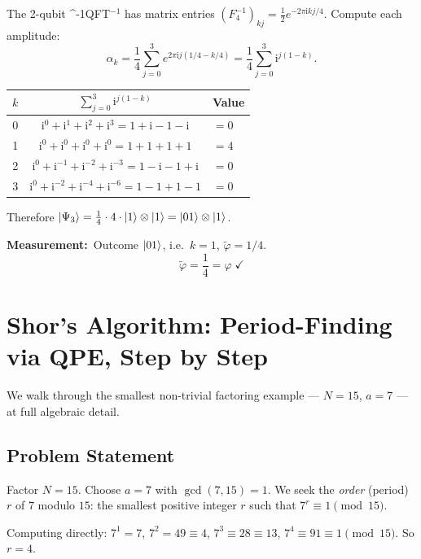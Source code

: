 \documentclass[12pt,a4paper]{article}
\newcommand{\IQFT}{\ifmmode \text{\textsc{QFT}}^{-1}\else \textsc{QFT}$^{-1}$\fi}
\newcommand{\ii}{\mathrm{i}}
\begin{document}
The 2-qubit \IQFT{} has matrix entries
$(F_4^{-1})_{kj} = \frac{1}{2}e^{-2\pi\ii kj/4}$.  Compute each amplitude:
\[
  \alpha_k = \frac{1}{4}\sum_{j=0}^3 e^{2\pi\ii j(1/4 - k/4)}
           = \frac{1}{4}\sum_{j=0}^3 \ii^{j(1-k)}.
\]
\begin{center}
\begin{tabular}{@{}ccl@{}}
\toprule
$k$ & $\sum_{j=0}^3 \ii^{j(1-k)}$ & Value \\
\midrule
0 & $\ii^0+\ii^1+\ii^2+\ii^3 = 1+\ii-1-\ii$ & $= 0$ \\
1 & $\ii^0+\ii^0+\ii^0+\ii^0 = 1+1+1+1$      & $= 4$ \\
2 & $\ii^0+\ii^{-1}+\ii^{-2}+\ii^{-3} = 1-\ii-1+\ii$ & $= 0$ \\
3 & $\ii^0+\ii^{-2}+\ii^{-4}+\ii^{-6} = 1-1+1-1$ & $= 0$ \\
\bottomrule
\end{tabular}
\end{center}

Therefore $\Ket{\Psi_3} = \frac{1}{4}\cdot 4\cdot\Ket{1}\otimes\Ket{1} = \Ket{01}\otimes\Ket{1}$.

\medskip\noindent\textbf{Measurement:}\ Outcome $\Ket{01}$, i.e.\ $k=1$,
$\tilde\varphi = 1/4$.
\[
  \boxed{\tilde\varphi = \frac{1}{4} = \varphi\;\checkmark}
\]

\newpage

\section{Shor's Algorithm: Period-Finding via QPE, Step by Step}
\label{app:shor}

We walk through the smallest non-trivial factoring example —
$N=15$, $a=7$ — at full algebraic detail.

\subsection{Problem Statement}

Factor $N = 15$.  Choose $a = 7$ with $\gcd(7,15) = 1$.
We seek the \emph{order} (period) $r$ of $7$ modulo $15$:
the smallest positive integer $r$ such that $7^r \equiv 1 \pmod{15}$.

Computing directly: $7^1=7$, $7^2=49\equiv 4$, $7^3 \equiv 28\equiv 13$,
$7^4 \equiv 91\equiv 1 \pmod{15}$.  So $r = 4$.
\end{document}
